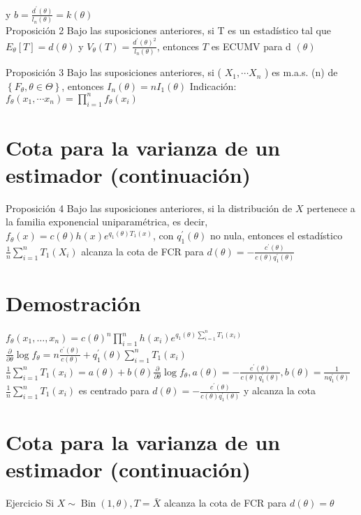 y $b=\frac{d^{\prime}(\theta)}{l_{n}(\theta)}=k(\theta)$\\
Proposición 2 Bajo las suposiciones anteriores, si T es un estadístico tal que $E_{\theta}[T]=d(\theta)$ y $V_{\theta}(T)=\frac{d^{\prime}(\theta)^{2}}{l_{n}(\theta)}$, entonces $T$ es ECUMV para d $(\theta)$

Proposición 3 Bajo las suposiciones anteriores, si ( $X_{1}, \cdots X_{n}$ ) es m.a.s. (n) de $\left\{F_{\theta}, \theta \in \Theta\right\}$, entonces $I_{n}(\theta)=n I_{1}(\theta)$ Indicación: $f_{\theta}\left(x_{1}, \cdots x_{n}\right)=\prod_{i=1}^{n} f_{\theta}\left(x_{i}\right)$

\section*{Cota para la varianza de un estimador (continuación)}
Proposición 4 Bajo las suposiciones anteriores, si la distribución de $X$ pertenece a la familia exponencial uniparamétrica, es decir, $f_{\theta}(x)=c(\theta) h(x) e^{q_{1}(\theta) T_{1}(x)}$, con $q_{1}^{\prime}(\theta)$ no nula, entonces el estadístico $\frac{1}{n} \sum_{i=1}^{n} T_{1}\left(X_{i}\right)$ alcanza la cota de FCR para $d(\theta)=-\frac{c^{\prime}(\theta)}{c(\theta) q_{1}^{\prime}(\theta)}$

\section*{Demostración}
$f_{\theta}\left(x_{1}, \ldots, x_{n}\right)=c(\theta)^{n} \prod_{i=1}^{n} h\left(x_{i}\right) e^{q_{1}(\theta) \sum_{i=1}^{n} T_{1}\left(x_{i}\right)}$\\
$\frac{\partial}{\partial \theta} \log f_{\theta}=n \frac{c^{\prime}(\theta)}{c(\theta)}+q_{1}^{\prime}(\theta) \sum_{i=1}^{n} T_{1}\left(x_{i}\right)$\\
$\frac{1}{n} \sum_{i=1}^{n} T_{1}\left(x_{i}\right)=a(\theta)+b(\theta) \frac{\partial}{\partial \theta} \log f_{\theta}, a(\theta)=-\frac{c^{\prime}(\theta)}{c(\theta) q_{1}^{\prime}(\theta)}, b(\theta)=\frac{1}{n q_{1}^{\prime}(\theta)}$\\
$\frac{1}{n} \sum_{i=1}^{n} T_{1}\left(x_{i}\right)$ es centrado para $d(\theta)=-\frac{c^{\prime}(\theta)}{c(\theta) q_{1}^{\prime}(\theta)}$ y alcanza la cota

\section*{Cota para la varianza de un estimador (continuación)}
Ejercicio Si $X \sim \operatorname{Bin}(1, \theta), T=\bar{X}$ alcanza la cota de FCR para $d(\theta)=\theta$


